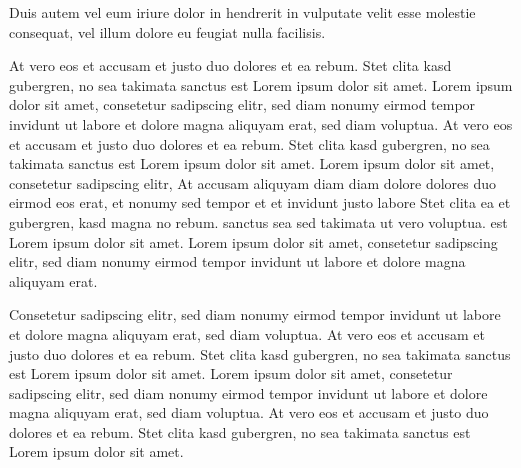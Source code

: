 \documentclass[twoside,a4paper]{article}
\begin{document}
Duis autem vel eum iriure dolor in hendrerit in vulputate velit esse
molestie consequat, vel illum dolore eu feugiat nulla facilisis.

At vero eos et accusam et justo duo dolores et ea rebum. Stet clita
kasd gubergren, no sea takimata sanctus est Lorem ipsum dolor sit
amet. Lorem ipsum dolor sit amet, consetetur sadipscing elitr, sed
diam nonumy eirmod tempor invidunt ut labore et dolore magna aliquyam
erat, sed diam voluptua. At vero eos et accusam et justo duo dolores
et ea rebum. Stet clita kasd gubergren, no sea takimata sanctus est
Lorem ipsum dolor sit amet. Lorem ipsum dolor sit amet, consetetur
sadipscing elitr, At accusam aliquyam diam diam dolore dolores duo
eirmod eos erat, et nonumy sed tempor et et invidunt justo labore Stet
clita ea et gubergren, kasd magna no rebum. sanctus sea sed takimata
ut vero voluptua. est Lorem ipsum dolor sit amet. Lorem ipsum dolor
sit amet, consetetur sadipscing elitr, sed diam nonumy eirmod tempor
invidunt ut labore et dolore magna aliquyam erat.

Consetetur sadipscing elitr, sed diam nonumy eirmod tempor invidunt ut
labore et dolore magna aliquyam erat, sed diam voluptua. At vero eos
et accusam et justo duo dolores et ea rebum. Stet clita kasd
gubergren, no sea takimata sanctus est Lorem ipsum dolor sit
amet. Lorem ipsum dolor sit amet, consetetur sadipscing elitr, sed
diam nonumy eirmod tempor invidunt ut labore et dolore magna aliquyam
erat, sed diam voluptua. At vero eos et accusam et justo duo dolores
et ea rebum. Stet clita kasd gubergren, no sea takimata sanctus est
Lorem ipsum dolor sit amet.
\end{document}
